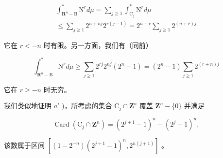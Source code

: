 \[
\begin{array}{c} \int_ {\mathbf {R} ^ {n} - \mathrm{B}} ^ {*} \mathrm{N} ^ {r} d \mu = \sum_ {j \geqslant 1} \int_ {\mathrm{C} _ {j}} ^ {*} \mathrm{N} ^ {r} d \mu \\ \leqslant \sum_ {j \geqslant 1} 2 ^ {n + n j} 2 ^ {r (j - 1)} = 2 ^ {n - r} \sum_ {j \geqslant 1} 2 ^ {(n + r) j} \end{array}
\]

它在 \(r < -n\) 时有限。另一方面，我们有（同前）

\[
\int_ {\mathbf {R} ^ {n} - \mathrm{B}} ^ {*} \mathrm{N} ^ {r} d \mu \geqslant \sum_ {j \geqslant 1} 2 ^ {r j} 2 ^ {n j} (2 ^ {n} - 1) = (2 ^ {n} - 1) \sum_ {j \geqslant 1} 2 ^ {(r + n) j}
\]

它在 \(r \geqslant -n\) 时无穷。

我们类似地证明 \(a'\) )，所考虑的集合 \(\mathrm{C}_{j} \cap \mathbf{Z}^{n}\) 覆盖 \(\mathbf{Z}^{n} - \{0\}\) 并满足

\[
\operatorname{Card} \left(\mathrm{C} _ {j} \cap \mathbf {Z} ^ {n}\right) = (2 ^ {j + 1} - 1) ^ {n} - (2 ^ {j} - 1) ^ {n},
\]

该数属于区间 \([(1-2^{-n})(2^{j+1}-1)^{n},2^{n(j+1)}]\) 。

